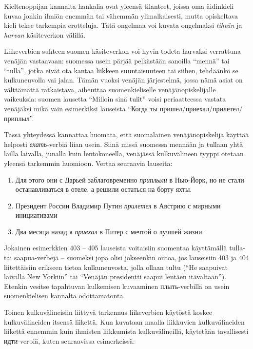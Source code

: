 \documentclass[]{scrreprt}
\providecommand{\tightlist}{%
  \setlength{\itemsep}{0pt}\setlength{\parskip}{0pt}}
\begin{document}
Kieltenoppijan kannalta hankalia ovat yleensä tilanteet, joissa oma
äidinkieli kuvaa jonkin ilmiön enemmän tai vähemmän ylimalkaisesti,
mutta opiskeltava kieli tekee tarkempia erotteluja. Tätä ongelmaa voi
kuvata ongelmaksi \emph{tiheän} ja \emph{harvan} käsiteverkon välillä.

Liikeverbien suhteen suomen käsiteverkon voi hyvin todeta harvaksi
verrattuna venäjän vastaavaan: suomessa usein pärjää pelkästään sanoilla
``mennä'' tai ``tulla'', jotka eivät ota kantaa liikkeen suuntaisuuteen
tai siihen, tehdäänkö se kulkuneuvolla vai jalan. Tämän vuoksi venäjän
järjestelmä, jossa nämä asiat on välttämättä ratkaistava, aiheuttaa
suomenkieliselle venäjänopiskelijalle vaikeuksia: suomen lausetta
``Milloin sinä tulit'' voisi periaatteessa vastata venäjäksi mikä vain
esimerkiksi lauseista ``Когда ты пришел/приехал/прилетел/приплыл''.

Tässä yhteydessä kannattaa huomata, että suomalainen venäjänopiskelija
käyttää helposti \emph{ехать}-verbiä liian usein. Siinä missä suomessa
mennään ja tullaan yhtä lailla laivalla, junalla kuin lentokoneella,
venäjässä kulkuvälineen tyyppi otetaan yleensä tarkemmin huomioon.
Vertaa seuraavia lauseita:

\begin{enumerate}
\def\labelenumi{(\arabic{enumi})}
\setcounter{enumi}{402}
\tightlist
\item
  Для этого они с Дарьей заблаговременно \emph{приплыли} в Нью-Йорк, но
  не стали останавливаться в отеле, а решили остаться на борту яхты.
\item
  Президент России Владимир Путин \emph{прилетел} в Австрию с мирными
  инициативами
\item
  Два месяца назад я \emph{приехал} в Питер с мечтой о лучшей жизни.
\end{enumerate}

Jokainen esimerkkien 403 -- 405 lauseista voitaisiin suomentaa
käyttämällä tulla- tai saapua-verbejä -- suomeksi jopa olisi jokseenkin
outoa, jos lauseisiin 403 ja 404 liitettäisiin erikseen tietoa
kulkuneuvosta, jolla ollaan tultu (``He saapuivat laivalla New Yorkiin''
tai ``Venäjän presidentti saapui lentäen itävaltaan''). Etenkin vesitse
tapahtuvan kulkemisen kuvaaminen плыть-verbillä on usein suomenkielisen
kannalta odottamatonta.

Toinen kulkuvälineisiin liittyvä tarkennus liikeverbien käytöstä koskee
kulkuvälineiden itsensä liikettä. Kun kuvataan maalla liikkuvien
kulkuvälineiden liikettä ennemmin kuin ihmisten liikkumista
kulkuvälineillä, käytetään tavallisesti идти-verbiä, kuten seuraavissa
esimerkeissä:
\end{document}
